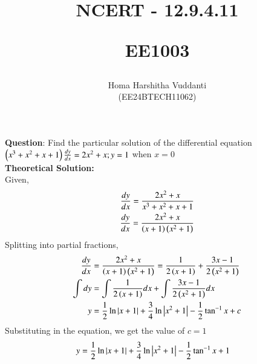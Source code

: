 \documentclass[journal]{IEEEtran}
\begin{document}


\title{
NCERT - 12.9.4.11

\large{EE1003}
}
\author{Homa Harshitha Vuddanti

(EE24BTECH11062)
}	

\maketitle

\bigskip

\renewcommand{\thefigure}{\theenumi}
\renewcommand{\thetable}{\theenumi}
\textbf{Question}: Find the particular solution of the differential equation $\left(x^3+x^2+x+1\right)\frac{dy}{dx}=2x^2+x; y=1$ when $x=0$\\
\textbf{Theoretical Solution: }\\
Given,
\begin{align}
\frac{dy}{dx}=\frac{2x^2+x}{x^3+x^2+x+1}\\
\frac{dy}{dx}=\frac{2x^2+x}{\left(x+1\right)\left(x^2+1\right)}\\
\end{align}
Splitting into partial fractions,\\
\begin{align}
\frac{dy}{dx}&=\frac{2x^2+x}{\left(x+1\right)\left(x^2+1\right)}=\frac{1}{2\left(x+1\right)}+\frac{3x-1}{2\left(x^2+1\right)}\\
\int dy&=\int \frac{1}{2\left(x+1\right)}dx+\int \frac{3x-1}{2\left(x^2+1\right)}dx\\
y&=\frac{1}{2} \ln{\left\vert x+1\right\vert}+\frac{3}{4}\ln{\left\vert x^2+1\right\vert}-\frac{1}{2}\tan^{-1}x+c
\end{align}
Substituting  in the equation, we get the value of $c=1$
\begin{align}
y&=\frac{1}{2} \ln{\left\vert x+1\right\vert}+\frac{3}{4}\ln{\left\vert x^2+1\right\vert}-\frac{1}{2}\tan^{-1}x+1
\end{align}
\end{document}

